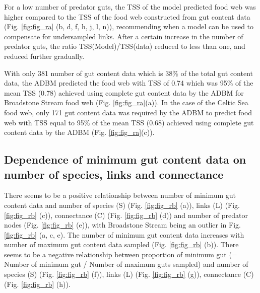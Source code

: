\documentclass{article}
\begin{document}
For a low number of predator guts, the TSS of the model predicted food
web was higher compared to the TSS of the food web constructed from gut
content data (Fig. \ref{fig:fig_ra} (b, d, f, h, j, l, n)), recommending
when a model can be used to compensate for undersampled links. After a
certain increase in the number of predator guts, the ratio
TSS(Model)/TSS(data) reduced to less than one, and reduced further
gradually.

With only 381 number of gut content data which is 38\% of the total gut
content data, the ADBM predicted the food web with TSS of 0.74 which was
95\% of the mean TSS (0.78) achieved using complete gut content data by
the ADBM for Broadstone Stream food web (Fig. \ref{fig:fig_ra}(a)). In
the case of the Celtic Sea food web, only 171 gut content data was
required by the ADBM to predict food web with TSS equal to 95\% of the
mean TSS (0.68) achieved using complete gut content data by the ADBM
(Fig. \ref{fig:fig_ra}(c)).

\hypertarget{dependence-of-minimum-gut-content-data-on-number-of-species-links-and-connectance}{%
\subsection{Dependence of minimum gut content data on number of species,
links and
connectance}\label{dependence-of-minimum-gut-content-data-on-number-of-species-links-and-connectance}}

There seems to be a positive relationship between number of minimum gut
content data and number of species (S) (Fig. \ref{fig:fig_rb} (a)),
links (L) (Fig. \ref{fig:fig_rb} (c)), connectance (C) (Fig.
\ref{fig:fig_rb} (d)) and number of predator nodes (Fig.
\ref{fig:fig_rb} (e)), with Broadstone Stream being an outlier in Fig.
\ref{fig:fig_rb} (a, c, e). The number of minimum gut content data
increases with number of maximum gut content data sampled (Fig.
\ref{fig:fig_rb} (b)). There seems to be a negative relationship between
proportion of minimum gut (= Number of minimum gut / Number of maximum
guts sampled) and number of species (S) (Fig. \ref{fig:fig_rb} (f)),
links (L) (Fig. \ref{fig:fig_rb} (g)), connectance (C) (Fig.
\ref{fig:fig_rb} (h)).
\end{document}
